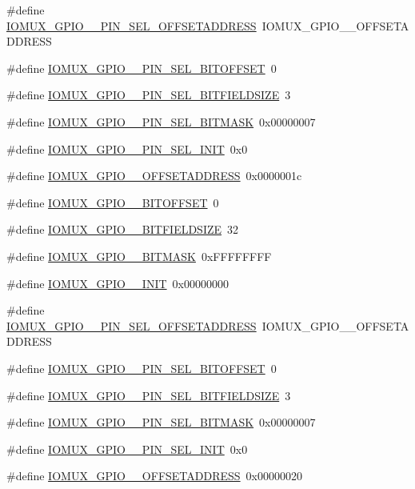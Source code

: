 \begin{DoxyCompactItemize}
\item 
\#define \hyperlink{a00560_aaa6f8bd4a924450ddc29f535675ae4d6}{IOMUX\_\-GPIO\_\_\-PIN\_\-SEL\_\-OFFSETADDRESS}~IOMUX\_\-GPIO\_\_\-OFFSETADDRESS
\item 
\#define \hyperlink{a00560_a57837c39ebb9a561774244eaa8e9076b}{IOMUX\_\-GPIO\_\_\-PIN\_\-SEL\_\-BITOFFSET}~0
\item 
\#define \hyperlink{a00560_af662c679ec79afcbd15f75890bd3a418}{IOMUX\_\-GPIO\_\_\-PIN\_\-SEL\_\-BITFIELDSIZE}~3
\item 
\#define \hyperlink{a00560_a080c4fe5c38ed07fbfe9b2a0f9d0e48d}{IOMUX\_\-GPIO\_\_\-PIN\_\-SEL\_\-BITMASK}~0x00000007
\item 
\#define \hyperlink{a00560_a641a20884f79f2e87851b785ff336fd0}{IOMUX\_\-GPIO\_\_\-PIN\_\-SEL\_\-INIT}~0x0
\item 
\#define \hyperlink{a00560_afeeaa4ee09b22ef49a4698a453f2798b}{IOMUX\_\-GPIO\_\_\-OFFSETADDRESS}~0x0000001c
\item 
\#define \hyperlink{a00560_a6bfe45e5655dad41dae623888f4c777d}{IOMUX\_\-GPIO\_\_\-BITOFFSET}~0
\item 
\#define \hyperlink{a00560_aae8a90ffc48714eb12f4f3b6f9a88bcc}{IOMUX\_\-GPIO\_\_\-BITFIELDSIZE}~32
\item 
\#define \hyperlink{a00560_ace9ee6161bfeb281919dd88823c6cce9}{IOMUX\_\-GPIO\_\_\-BITMASK}~0xFFFFFFFF
\item 
\#define \hyperlink{a00560_a1ae2b2fdeeb811453310f3fe58572015}{IOMUX\_\-GPIO\_\_\-INIT}~0x00000000
\item 
\#define \hyperlink{a00560_a022b6f584e8e8fb74cb10e39c0fb720e}{IOMUX\_\-GPIO\_\_\-PIN\_\-SEL\_\-OFFSETADDRESS}~IOMUX\_\-GPIO\_\_\-OFFSETADDRESS
\item 
\#define \hyperlink{a00560_af4a111009dd9fb95fd569156fcb7bb34}{IOMUX\_\-GPIO\_\_\-PIN\_\-SEL\_\-BITOFFSET}~0
\item 
\#define \hyperlink{a00560_a2c5aac1454867d658705215d7df09027}{IOMUX\_\-GPIO\_\_\-PIN\_\-SEL\_\-BITFIELDSIZE}~3
\item 
\#define \hyperlink{a00560_a0f0d30781682412182acb6895c19053f}{IOMUX\_\-GPIO\_\_\-PIN\_\-SEL\_\-BITMASK}~0x00000007
\item 
\#define \hyperlink{a00560_ae1d599226e70875e75a7d03f0b0e880e}{IOMUX\_\-GPIO\_\_\-PIN\_\-SEL\_\-INIT}~0x0
\item 
\#define \hyperlink{a00560_a6cf815e533fd472c08d29f0a979d8848}{IOMUX\_\-GPIO\_\_\-OFFSETADDRESS}~0x00000020
\item 

\end{DoxyCompactItemize}
